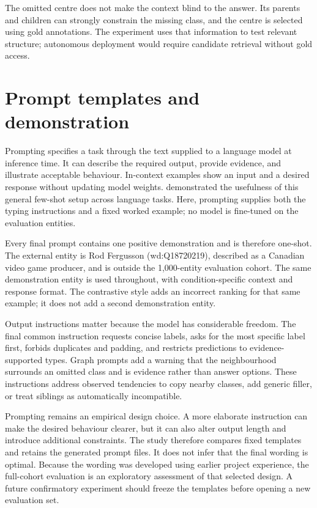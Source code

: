 The omitted centre does not make the context blind to the answer. Its parents and children can strongly constrain the missing class, and the centre is selected using gold annotations. The experiment uses that information to test relevant structure; autonomous deployment would require candidate retrieval without gold access.


\FloatBarrier

\section{Prompt templates and demonstration}

Prompting specifies a task through the text supplied to a language model at inference time. It can describe the required output, provide evidence, and illustrate acceptable behaviour. In-context examples show an input and a desired response without updating model weights. \citet{brown2020} demonstrated the usefulness of this general few-shot setup across language tasks. Here, prompting supplies both the typing instructions and a fixed worked example; no model is fine-tuned on the evaluation entities.


Every final prompt contains one positive demonstration and is therefore one-shot. The external entity is Rod Fergusson (wd:Q18720219), described as a Canadian video game producer, and is outside the 1,000-entity evaluation cohort. The same demonstration entity is used throughout, with condition-specific context and response format. The contrastive style adds an incorrect ranking for that same example; it does not add a second demonstration entity.


Output instructions matter because the model has considerable freedom. The final common instruction requests concise labels, asks for the most specific label first, forbids duplicates and padding, and restricts predictions to evidence-supported types. Graph prompts add a warning that the neighbourhood surrounds an omitted class and is evidence rather than answer options. These instructions address observed tendencies to copy nearby classes, add generic filler, or treat siblings as automatically incompatible.


Prompting remains an empirical design choice. A more elaborate instruction can make the desired behaviour clearer, but it can also alter output length and introduce additional constraints. The study therefore compares fixed templates and retains the generated prompt files. It does not infer that the final wording is optimal. Because the wording was developed using earlier project experience, the full-cohort evaluation is an exploratory assessment of that selected design. A future confirmatory experiment should freeze the templates before opening a new evaluation set.


